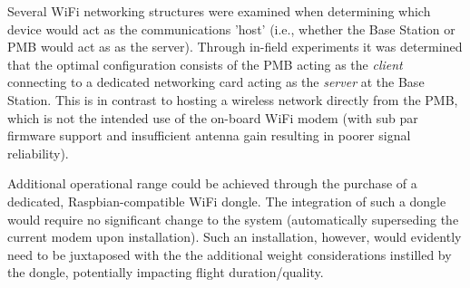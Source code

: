 Several WiFi networking structures were examined when determining which device would act as the communications 'host' (i.e., whether the Base Station or PMB would act as as the server). Through in-field experiments it was determined that the optimal configuration consists of the PMB acting as the \textit{client} connecting to a dedicated networking card acting as the \textit{server} at the Base Station. This is in contrast to hosting a wireless network directly from the PMB, which is not the intended use of the on-board WiFi modem (with sub par firmware support and insufficient antenna gain resulting in poorer signal reliability). 

Additional operational range could be achieved through the purchase of a dedicated, Raspbian-compatible WiFi dongle. The integration of such a dongle would require no significant change to the system (automatically superseding the current modem upon installation). Such an installation, however, would evidently need to be juxtaposed with the the additional weight considerations instilled by the dongle, potentially impacting flight duration/quality.
